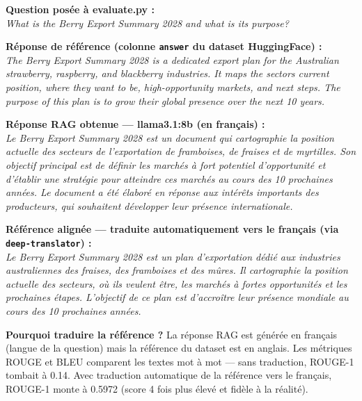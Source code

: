 \documentclass[12pt,a4paper]{report}
\begin{document}
\vspace{6pt}
\begin{evalbox}
\textbf{Question posée à evaluate.py :}\\[4pt]
\textit{What is the Berry Export Summary 2028 and what is its purpose?}

\vspace{10pt}
\textbf{Réponse de référence (colonne \texttt{answer} du dataset HuggingFace) :}\\[4pt]
\textit{The Berry Export Summary 2028 is a dedicated export plan for the Australian
strawberry, raspberry, and blackberry industries. It maps the sectors current position,
where they want to be, high-opportunity markets, and next steps. The purpose of this
plan is to grow their global presence over the next 10 years.}

\vspace{10pt}
\textbf{Réponse RAG obtenue — llama3.1:8b (en français) :}\\[4pt]
\textit{Le Berry Export Summary 2028 est un document qui cartographie la position
actuelle des secteurs de l'exportation de framboises, de fraises et de myrtilles.
Son objectif principal est de définir les marchés à fort potentiel d'opportunité
et d'établir une stratégie pour atteindre ces marchés au cours des 10 prochaines
années. Le document a été élaboré en réponse aux intérêts importants des producteurs,
qui souhaitent développer leur présence internationale.}

\vspace{10pt}
\textbf{Référence alignée — traduite automatiquement vers le français
(via \texttt{deep-translator}) :}\\[4pt]
\textit{Le Berry Export Summary 2028 est un plan d'exportation dédié aux industries
australiennes des fraises, des framboises et des mûres. Il cartographie la position
actuelle des secteurs, où ils veulent être, les marchés à fortes opportunités et
les prochaines étapes. L'objectif de ce plan est d'accroître leur présence mondiale
au cours des 10 prochaines années.}
\end{evalbox}

\begin{captionbox}
\textbf{Pourquoi traduire la référence ?} La réponse RAG est générée en français
(langue de la question) mais la référence du dataset est en anglais. Les métriques
ROUGE et BLEU comparent les textes mot à mot — sans traduction, ROUGE-1 tombait
à 0.14. Avec traduction automatique de la référence vers le français, ROUGE-1
monte à 0.5972 (score 4 fois plus élevé et fidèle à la réalité).
\end{captionbox}
\end{document}
